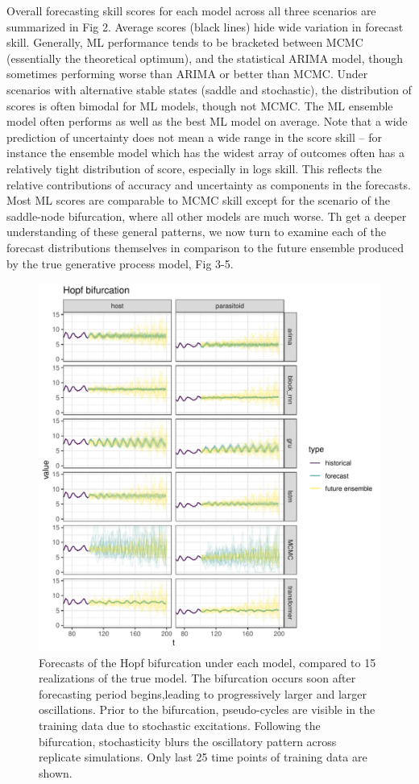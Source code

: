 \documentclass{article}
\begin{document}
Overall forecasting skill scores for each model across all three
scenarios are summarized in Fig 2. Average scores (black lines) hide
wide variation in forecast skill. Generally, ML performance tends to be
bracketed between MCMC (essentially the theoretical optimum), and the
statistical ARIMA model, though sometimes performing worse than ARIMA or
better than MCMC. Under scenarios with alternative stable states (saddle
and stochastic), the distribution of scores is often bimodal for ML
models, though not MCMC. The ML ensemble model often performs as well as
the best ML model on average. Note that a wide prediction of uncertainty
does not mean a wide range in the score skill -- for instance the
ensemble model which has the widest array of outcomes often has a
relatively tight distribution of score, especially in logs skill. This
reflects the relative contributions of accuracy and uncertainty as
components in the forecasts. Most ML scores are comparable to MCMC skill
except for the scenario of the saddle-node bifurcation, where all other
models are much worse. Th get a deeper understanding of these general
patterns, we now turn to examine each of the forecast distributions
themselves in comparison to the future ensemble produced by the true
generative process model, Fig 3-5.

\begin{figure}
\centering
\includegraphics{manuscript_files/figure-latex/figure3-1.pdf}
\caption{Forecasts of the Hopf bifurcation under each model, compared to
15 realizations of the true model. The bifurcation occurs soon after
forecasting period begins,leading to progressively larger and larger
oscillations. Prior to the bifurcation, pseudo-cycles are visible in the
training data due to stochastic excitations. Following the bifurcation,
stochasticity blurs the oscillatory pattern across replicate
simulations. Only last 25 time points of training data are shown.}
\end{figure}
\end{document}
